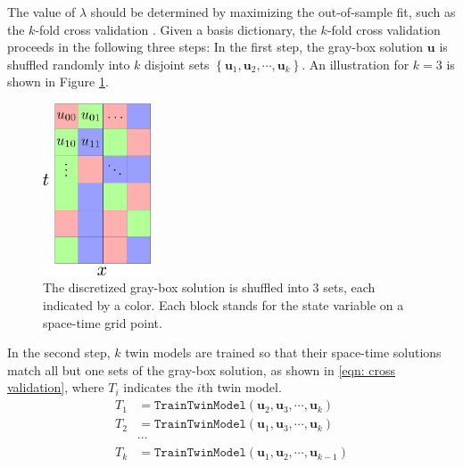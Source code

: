 The value of $\lambda$ should be determined by maximizing the 
out-of-sample fit, such as the $k$-fold cross validation
\cite{cross validation}. 
Given a basis dictionary, the $k$-fold cross validation proceeds in the following three steps:
In the first step, the gray-box solution $\boldsymbol{u}$ is shuffled randomly into $k$ disjoint sets
$\left\{\boldsymbol{u}_1 , \boldsymbol{u}_2, \cdots, \boldsymbol{u}_k\right\}$.
An illustration for $k=3$ is shown in Figure \ref{fig: shuffle}.
\begin{figure}[htbp]
    \begin{center}
        \includegraphics[width=3.2cm]{../shuffle_1.png}
        \caption{The discretized 
                 gray-box solution is shuffled into $3$ sets, each indicated by a color. 
                 Each block stands for the state variable on a space-time grid point.}
        \label{fig: shuffle}
    \end{center}
\end{figure}

In the second step, $k$ twin models are trained so that their space-time solutions match
all but one sets of the gray-box solution, as shown in \eqref{eqn: cross validation}, where
$T_i$ indicates the $i$th twin model.
\begin{equation}\begin{split}
T_1 &= \texttt{TrainTwinModel}(\boldsymbol{u}_2, \boldsymbol{u}_3, \cdots, \boldsymbol{u}_k)\\
T_2 &= \texttt{TrainTwinModel}(\boldsymbol{u}_1, \boldsymbol{u}_3, \cdots, \boldsymbol{u}_k)\\
&\cdots\\
T_k &= \texttt{TrainTwinModel}(\boldsymbol{u}_1, \boldsymbol{u}_2, \cdots, \boldsymbol{u}_{k-1})
\label{eqn: cross validation}
\end{split}\end{equation}

